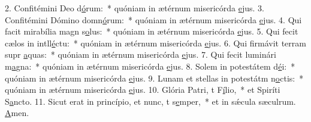 2. Confitémini Deo d\uline{ó}rum:~* quóniam in ætérnum misericórda \uline{e}jus.
3. Confitémini Dómino domn\uline{ó}rum:~* quóniam in ætérnum misericórda \uline{e}jus.
4. Qui facit mirabília magn s\uline{o}lus:~* quóniam in ætérnum misericórda \uline{e}jus.
5. Qui fecit cælos in intll\uline{é}ctu:~* quóniam in ætérnum misericórda \uline{e}jus.
6. Qui firmávit terram supr \uline{a}quas:~* quóniam in ætérnum misericórda \uline{e}jus.
7. Qui fecit luminári m\uline{a}gna:~* quóniam in ætérnum misericórda \uline{e}jus.
8. Solem in potestátem d\uline{é}i:~* quóniam in ætérnum misericórda \uline{e}jus.
9. Lunam et stellas in potestátm n\uline{o}ctis:~* quóniam in ætérnum misericórda \uline{e}jus.
10. Glória Patri, t F\uline{í}lio,~* et Spiríti S\uline{a}ncto.
11. Sicut erat in princípio, et nunc, t s\uline{e}mper,~* et in sǽcula sæculrum. \uline{A}men.
